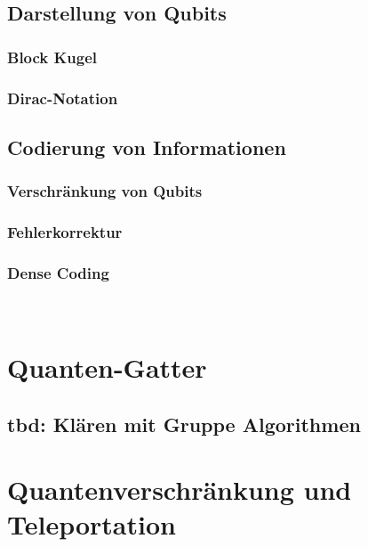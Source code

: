 \subsection{Darstellung von Qubits}
\subsubsection{Block Kugel}
\subsubsection{Dirac-Notation}
\subsection{Codierung von Informationen}
\subsubsection{Verschränkung von Qubits}
\subsubsection{Fehlerkorrektur}
\subsubsection{Dense Coding}
\\


\section{Quanten-Gatter}
\subsection{tbd: Klären mit Gruppe Algorithmen}


\section{Quantenverschränkung und Teleportation}

